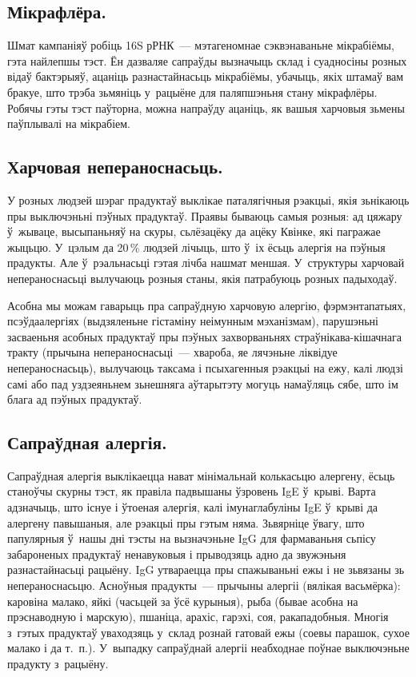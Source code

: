 \subsection{Мікрафлёра.}
Шмат кампаніяў робіць 16S рРНК~--- мэтагеномнае сэквэнаваньне мікрабіёмы, гэта найлепшы тэст. Ён дазваляе сапраўды вызначыць склад і суадносіны розных відаў бактэрыяў, ацаніць разнастайнасьць мікрабіёмы, убачыць, якіх штамаў вам бракуе, што трэба зьмяніць у~рацыёне для паляпшэньня стану мікрафлёры. Робячы гэты тэст паўторна, можна напраўду ацаніць, як вашыя харчовыя зьмены паўплывалі на мікрабіем.

\subsection{Харчовая непераноснасьць.}
У розных людзей шэраг прадуктаў выклікае паталягічныя рэакцыі, якія зьнікаюць пры выключэньні пэўных прадуктаў. Праявы бываюць самыя розныя: ад цяжару ў~жываце, высыпаньняў на скуры, сьлёзацёку да ацёку Квінке, які пагражае жыцьцю. У~цэлым да 20\,\% людзей лічыць, што ў~іх ёсьць алергія на пэўныя прадукты. Але ў~рэальнасьці гэтая лічба нашмат меншая. У~структуры харчовай непераноснасьці вылучаюць розныя станы, якія патрабуюць розных падыходаў.

Асобна мы можам гаварыць пра сапраўдную харчовую алергію, фэрмэнтапатыях, псэўдаалергіях (выдзяленьне гістаміну неімунным мэханізмам), парушэньні засваеньня асобных прадуктаў пры пэўных захворваньнях страўнікава-кішачнага тракту (прычына непераноснасьці~--- хвароба, яе лячэньне ліквідуе непераноснасьць), вылучаюць таксама і псыхагенныя рэакцыі на ежу, калі людзі самі або пад уздзеяньнем зьнешняга аўтарытэту могуць намаўляць сябе, што ім блага ад пэўных прадуктаў.

\subsection{Сапраўдная алергія.}
Сапраўдная алергія выклікаецца нават мінімальнай колькасьцю алергену, ёсьць станоўчы скурны тэст, як правіла падвышаны ўзровень IgE ў~крыві. Варта адзначыць, што існуе і ўтоеная алергія, калі імунаглабуліны IgE ў~крыві да алергену павышаныя, але рэакцыі пры гэтым няма. Зьвярніце ўвагу, што папулярныя ў~нашы дні тэсты на вызначэньне IgG для фармаваньня сьпісу забароненых прадуктаў ненавуковыя і прыводзяць адно да звужэньня разнастайнасьці рацыёну. IgG утвараецца пры спажываньні ежы і не зьвязаны зь непераноснасьцю. Асноўныя прадукты~--- прычыны алергіі (вялікая васьмёрка): каровіна малако, яйкі (часьцей за ўсё курыныя), рыба (бывае асобна на прэснаводную і марскую), пшаніца, арахіс, гарэхі, соя, ракападобныя. Многія з~гэтых прадуктаў уваходзяць у~склад рознай гатовай ежы (соевы парашок, сухое малако і да т.~п.). У~выпадку сапраўднай алергіі неабходнае поўнае выключэньне прадукту з~рацыёну.

